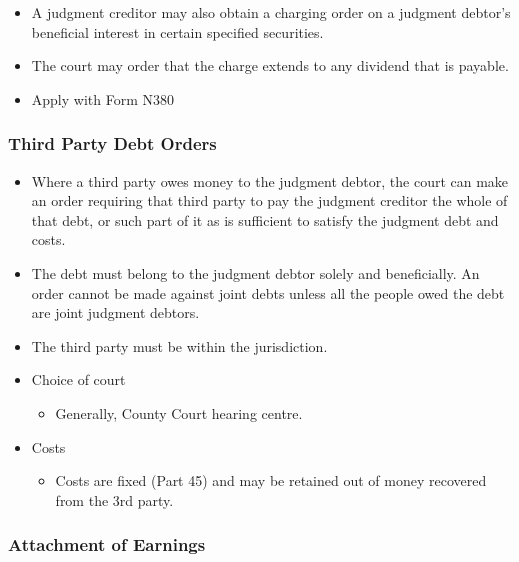 \documentclass[
]{article}
\providecommand{\tightlist}{%
  \setlength{\itemsep}{0pt}\setlength{\parskip}{0pt}}
\begin{document}
\begin{itemize}
\tightlist
\item
  A judgment creditor may also obtain a charging order on a judgment
  debtor's beneficial interest in certain specified securities.
\item
  The court may order that the charge extends to any dividend that is
  payable.
\item
  Apply with Form N380
\end{itemize}

\hypertarget{third-party-debt-orders}{%
\subsubsection{Third Party Debt Orders}\label{third-party-debt-orders}}

\begin{itemize}
\tightlist
\item
  Where a third party owes money to the judgment debtor, the court can
  make an order requiring that third party to pay the judgment creditor
  the whole of that debt, or such part of it as is sufficient to satisfy
  the judgment debt and costs.
\item
  The debt must belong to the judgment debtor solely and beneficially.
  An order cannot be made against joint debts unless all the people owed
  the debt are joint judgment debtors.
\item
  The third party must be within the jurisdiction.
\item
  Choice of court

  \begin{itemize}
  \tightlist
  \item
    Generally, County Court hearing centre.
  \end{itemize}
\item
  Costs

  \begin{itemize}
  \tightlist
  \item
    Costs are fixed (Part 45) and may be retained out of money recovered
    from the 3rd party.
  \end{itemize}
\end{itemize}

\hypertarget{attachment-of-earnings}{%
\subsubsection{Attachment of Earnings}\label{attachment-of-earnings}}
\end{document}
